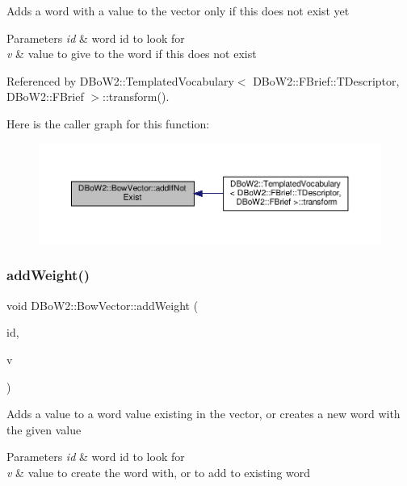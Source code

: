 Adds a word with a value to the vector only if this does not exist yet 
\begin{DoxyParams}{Parameters}
{\em id} & word id to look for \\
\hline
{\em v} & value to give to the word if this does not exist \\
\hline
\end{DoxyParams}


Referenced by D\+Bo\+W2\+::\+Templated\+Vocabulary$<$ D\+Bo\+W2\+::\+F\+Brief\+::\+T\+Descriptor, D\+Bo\+W2\+::\+F\+Brief $>$\+::transform().

Here is the caller graph for this function\+:\nopagebreak
\begin{figure}[H]
\begin{center}
\leavevmode
\includegraphics[width=350pt]{classDBoW2_1_1BowVector_a5ddf10e444d10425e5bd3568dc7ffe5e_icgraph}
\end{center}
\end{figure}
\mbox{\label{classDBoW2_1_1BowVector_a3ac92a805b252c93dc6535240d02df47}} 
\subsubsection{\texorpdfstring{add\+Weight()}{addWeight()}}
{\footnotesize\ttfamily void D\+Bo\+W2\+::\+Bow\+Vector\+::add\+Weight (\begin{DoxyParamCaption}\item[{\hyperlink{namespaceDBoW2_ab1a0d3283b2d4690a383372ed20bfeb5}{Word\+Id}}]{id,  }\item[{\hyperlink{namespaceDBoW2_a55fcd7333e591a38e96b91f41bc182f6}{Word\+Value}}]{v }\end{DoxyParamCaption})}

Adds a value to a word value existing in the vector, or creates a new word with the given value 
\begin{DoxyParams}{Parameters}
{\em id} & word id to look for \\
\hline
{\em v} & value to create the word with, or to add to existing word \\
\hline
\end{DoxyParams}


